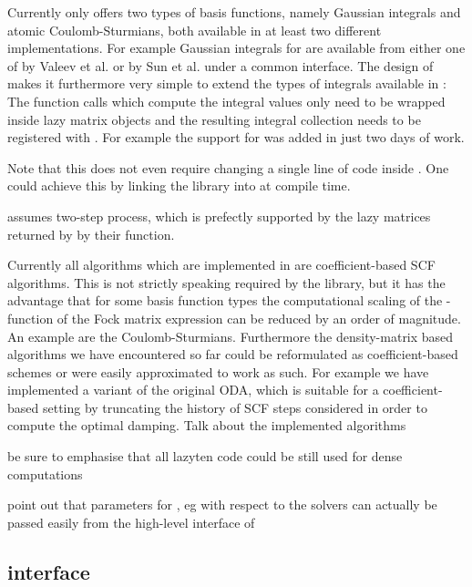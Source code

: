 Currently \gint only offers two types of basis functions,
namely Gaussian integrals and atomic Coulomb-Sturmians,
both available in at least two different implementations.
For example Gaussian integrals for \gint are available from either one of 
\libint by Valeev et al.\cite{Libint2,Libint2_231}
or \libcint by Sun et al. 
under a common interface.
The design of \gint makes it furthermore very simple to extend the types of integrals
available in \molsturm:
The function calls which compute the integral values only need to be wrapped
inside lazy matrix objects and the resulting integral collection needs to be registered
with \gint.
For example the support for \libcint was added in just two days of work.

Note that this does not even require changing a single line of code inside \gint.
One could achieve this by linking the library into \molsturm at compile time.

\gscf assumes two-step \SCF process,
which is prefectly supported by the lazy matrices returned by \gint
by their \update function.

Currently all algorithms which are implemented in \gscf are coefficient-based SCF algorithms.
This is not strictly speaking required by the library,
but it has the advantage that for some basis function types
the computational scaling of the \contraction-function
of the Fock matrix expression can be reduced by an order of magnitude.
An example are the Coulomb-Sturmians.
Furthermore the density-matrix based algorithms
we have encountered so far could be reformulated as coefficient-based schemes
or were easily approximated to work as such.
For example we have implemented a variant of the original ODA,
which is suitable for a coefficient-based setting by truncating
the history of SCF steps considered in order to compute the optimal damping.
Talk about the implemented algorithms

be sure to emphasise that all lazyten code could be still used for dense computations

point out that parameters for \lazyten, eg with respect to the solvers
can actually be passed easily from the high-level \python interface of \molsturm

\subsection{\molsturm \python interface}
\label{sec:MolsturmPython}

